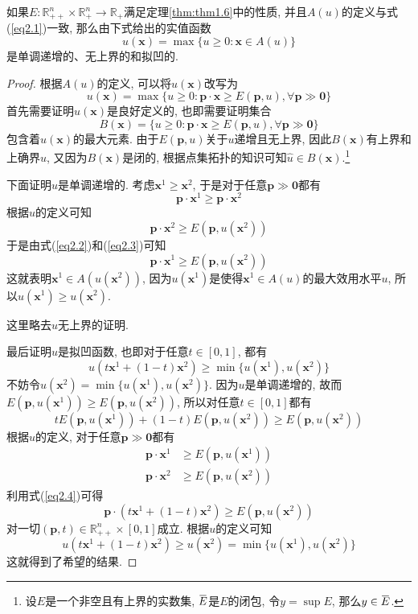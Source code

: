 \documentclass[cn, 12pt, math=mtpro2, bibstyle=apa, blue, twocol]{elegantbook}
\newcommand{\R}{\mathbb{R}}
\newcommand{\p}{\mathbf{p}}
\newcommand{\x}{\mathbf{x}}
\newcommand{\overbar}[1]{\mkern 1.5mu\overline{\mkern-1.5mu#1\mkern-1.5mu}\mkern 1.5mu}
\begin{document}
\begin{theorem}\label{thm:thm2.1}
  如果$E:\R_{++}^n\times\R_+^n\to\R_+$满足定理\ref{thm:thm1.6}中的性质, 并且$A(u)$的定义与式(\ref{eq2.1})一致, 那么由下式给出的实值函数
  \begin{equation}\label{eq2.5}
    u(\x)=\max\{u\ge0: \x\in A(u)\}
  \end{equation}
  是单调递增的、无上界的和拟凹的.
\end{theorem}
\begin{proof}
  根据$A(u)$的定义, 可以将$u(\x)$改写为
  \begin{equation}\label{eq2.9}
    u(\x)=\max\{u\ge0: \p\cdot\x\geq E(\p,u),\forall \p\gg\mathbf{0}\}
  \end{equation}
  首先需要证明$u(\x)$是良好定义的, 也即需要证明集合
  $$B(\x)=\{u\ge0: \p\cdot\x\geq E(\p,u),\forall \p\gg\mathbf{0}\}$$
  包含着$u(\x)$的最大元素. 由于$E(\p,u)$关于$u$递增且无上界, 因此$B(\x)$有上界和上确界$\hat{u}$, 又因为$B(\x)$是闭的, 根据点集拓扑的知识可知$\hat{u}\in B(\x)$.\footnote{设$E$是一个非空且有上界的实数集, $\overbar{E}$是$E$的闭包, 令$y=\sup E$, 那么$y\in\overbar{E}$.}
  
  下面证明$u$是单调递增的. 考虑$\x^1\ge\x^2$, 于是对于任意$\p\gg\mathbf{0}$都有
  \begin{equation}\label{eq2.2}
    \p\cdot\x^1\ge\p\cdot\x^2
  \end{equation}
  根据$u$的定义可知
  \begin{equation}\label{eq2.3}
    \p\cdot\x^2\geq E(\p,u(\x^2))
  \end{equation}
  于是由式(\ref{eq2.2})和(\ref{eq2.3})可知
  $$\p\cdot\x^1\geq E(\p,u(\x^2))$$
  这就表明$\x^1\in A(u(\x^2))$, 因为$u(\x^1)$是使得$\x^1\in A(u)$的最大效用水平$u$, 所以$u(\x^1)\ge u(\x^2)$. 
  
  这里略去$u$无上界的证明. 
  
  最后证明$u$是拟凹函数, 也即对于任意$t\in[0,1]$, 都有
  $$u(t\x^1+(1-t)\x^2)\geq \min\{u(\x^1), u(\x^2)\}$$
  不妨令$u(\x^2)=\min\{u(\x^1), u(\x^2)\}$. 因为$u$是单调递增的, 故而$E(\p,u(\x^1))\geq E(\p,u(\x^2))$, 所以对任意$t\in[0,1]$都有
  \begin{equation}\label{eq2.4}
    tE(\p,u(\x^1))+(1-t)E(\p,u(\x^2))\geq E(\p,u(\x^2))
  \end{equation}
  根据$u$的定义, 对于任意$\p\gg\mathbf{0}$都有
  \begin{align*}
  \p\cdot\x^1&\geq E(\p,u(\x^1)) \\
  \p\cdot\x^2&\geq E(\p,u(\x^2))
  \end{align*}
  利用式(\ref{eq2.4})可得
  $$\p\cdot(t\x^1+(1-t)\x^2)\geq E(\p,u(\x^2))$$
  对一切$(\p,t)\in\R_{++}^n\times [0,1]$成立. 根据$u$的定义可知
  $$u(t\x^1+(1-t)\x^2)\geq u(\x^2)=\min\{u(\x^1),u(\x^2)\}$$
  这就得到了希望的结果.
\end{proof}
\end{document}
